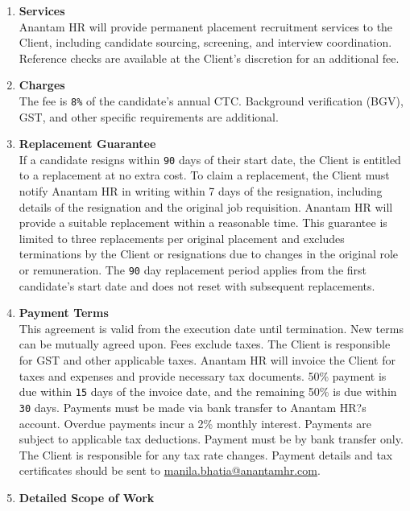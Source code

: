 \documentclass{article}
\begin{document}
\begin{enumerate}[label=\arabic{enumi}.]
    \item \textbf{Services}\\
        Anantam HR will provide permanent placement recruitment services to the Client, including candidate sourcing, screening, and interview coordination. Reference checks are available at the Client's discretion for an additional fee.
    \item \textbf{Charges}\\
        The fee is \texttt{8\%} of the candidate's annual CTC. Background verification (BGV), GST, and other specific requirements are additional.
    \item \textbf{Replacement Guarantee}\\
        If a candidate resigns within \texttt{90} days of their start date, the Client is entitled to a replacement at no extra cost. To claim a replacement, the Client must notify Anantam HR in writing within 7 days of the resignation, including details of the resignation and the original job requisition. Anantam HR will provide a suitable replacement within a reasonable time. This guarantee is limited to three replacements per original placement and excludes terminations by the Client or resignations due to changes in the original role or remuneration. The \texttt{90} day replacement period applies from the first candidate's start date and does not reset with subsequent replacements.
    \item \textbf{Payment Terms}\\
        This agreement is valid from the execution date until termination. New terms can be mutually agreed upon. Fees exclude taxes. The Client is responsible for GST and other applicable taxes. Anantam HR will invoice the Client for taxes and expenses and provide necessary tax documents. 50\% payment is due within \texttt{15} days of the invoice date, and the remaining 50\% is due within \texttt{30} days. Payments must be made via bank transfer to Anantam HR?s account. Overdue payments incur a 2\% monthly interest. Payments are subject to applicable tax deductions. Payment must be by bank transfer only. The Client is responsible for any tax rate changes. Payment details and tax certificates should be sent to \href{mailto:[manila.bhatia@anantamhr.com]}{manila.bhatia@anantamhr.com}.
    \item \textbf{Detailed Scope of Work}\\

\end{enumerate}
\end{document}
